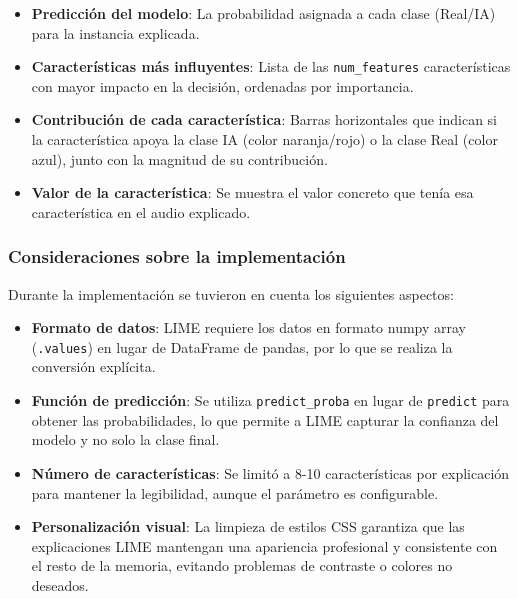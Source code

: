 \begin{itemize}
    \item \textbf{Predicción del modelo}: La probabilidad asignada a cada clase (Real/IA) para la instancia explicada.
    
    \item \textbf{Características más influyentes}: Lista de las \texttt{num\_features} características con mayor impacto en la decisión, ordenadas por importancia.
    
    \item \textbf{Contribución de cada característica}: Barras horizontales que indican si la característica apoya la clase IA (color naranja/rojo) o la clase Real (color azul), junto con la magnitud de su contribución.
    
    \item \textbf{Valor de la característica}: Se muestra el valor concreto que tenía esa característica en el audio explicado.
\end{itemize}

\subsubsection*{Consideraciones sobre la implementación}

Durante la implementación se tuvieron en cuenta los siguientes aspectos:

\begin{itemize}
    \item \textbf{Formato de datos}: LIME requiere los datos en formato numpy array (\texttt{.values}) en lugar de DataFrame de pandas, por lo que se realiza la conversión explícita.
    
    \item \textbf{Función de predicción}: Se utiliza \texttt{predict\_proba} en lugar de \texttt{predict} para obtener las probabilidades, lo que permite a LIME capturar la confianza del modelo y no solo la clase final.
    
    \item \textbf{Número de características}: Se limitó a 8-10 características por explicación para mantener la legibilidad, aunque el parámetro es configurable.
    
    \item \textbf{Personalización visual}: La limpieza de estilos CSS garantiza que las explicaciones LIME mantengan una apariencia profesional y consistente con el resto de la memoria, evitando problemas de contraste o colores no deseados.
\end{itemize}

